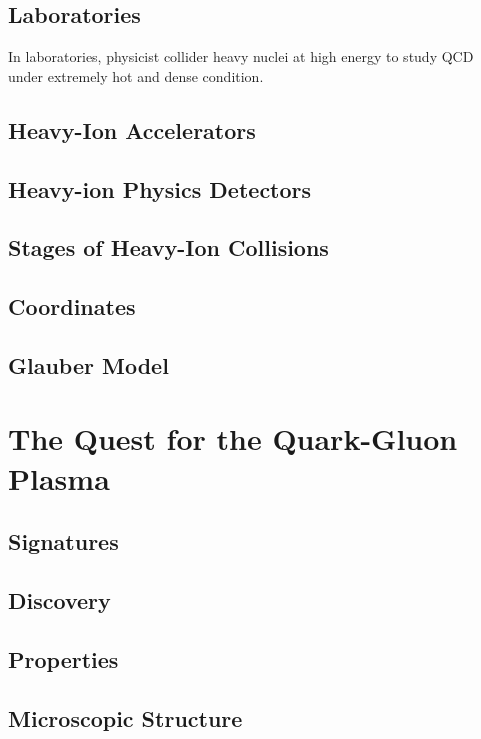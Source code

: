 \subsection{Laboratories}

In laboratories, physicist collider heavy nuclei at high energy to study QCD under extremely hot and dense condition.

\subsection{Heavy-Ion Accelerators}

\subsection{Heavy-ion Physics Detectors}

\subsection{Stages of Heavy-Ion Collisions}

\subsection{Coordinates}

\subsection{Glauber Model}

\section{The Quest for the Quark-Gluon Plasma}

\subsection{Signatures}

\subsection{Discovery}

\subsection{Properties}

\subsection{Microscopic Structure}

